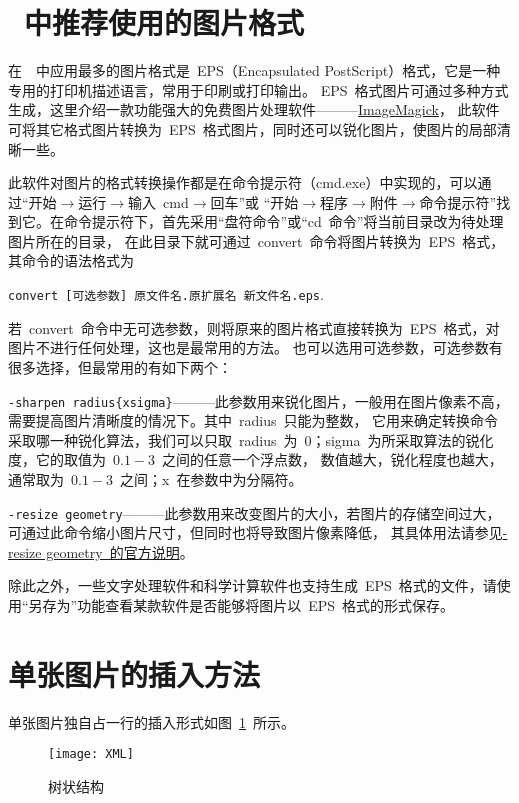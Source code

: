 \section{\XeLaTeX~中推荐使用的图片格式}
在~\XeLaTeX~中应用最多的图片格式是~EPS（Encapsulated PostScript）格式，它是一种专用的打印机描述语言，常用于印刷或打印输出。
EPS~格式图片可通过多种方式生成，这里介绍一款功能强大的免费图片处理软件———\href{http://www.imagemagick.org/}{ImageMagick}，
此软件可将其它格式图片转换为~EPS~格式图片，同时还可以锐化图片，使图片的局部清晰一些。

此软件对图片的格式转换操作都是在命令提示符（cmd.exe）中实现的，可以通过“开始$\to$运行$\to$输入~cmd$\to$回车”或
“开始$\to$程序$\to$附件$\to$命令提示符”找到它。在命令提示符下，首先采用“盘符命令”或“cd~命令”将当前目录改为待处理图片所在的目录，
在此目录下就可通过~convert~命令将图片转换为~EPS~格式，其命令的语法格式为

\indent\verb|convert [可选参数] 原文件名.原扩展名 新文件名.eps|.

若~convert~命令中无可选参数，则将原来的图片格式直接转换为~EPS~格式，对图片不进行任何处理，这也是最常用的方法。
也可以选用可选参数，可选参数有很多选择，但最常用的有如下两个：

\verb|-sharpen radius{xsigma}|———此参数用来锐化图片，一般用在图片像素不高，需要提高图片清晰度的情况下。其中~radius~只能为整数，
它用来确定转换命令采取哪一种锐化算法，我们可以只取~radius~为~0；sigma~为所采取算法的锐化度，它的取值为~$0.1 - 3$~之间的任意一个浮点数，
数值越大，锐化程度也越大，通常取为~$0.1 - 3$~之间；x~在参数中为分隔符。

\verb|-resize geometry|———此参数用来改变图片的大小，若图片的存储空间过大，可通过此命令缩小图片尺寸，但同时也将导致图片像素降低，
其具体用法请参见\href{http://www.imagemagick.org/script/command-line-options.php#resize}{-resize geometry~的官方说明}。

除此之外，一些文字处理软件和科学计算软件也支持生成~EPS~格式的文件，请使用“另存为”功能查看某款软件是否能够将图片以~EPS~格式的形式保存。

\section{单张图片的插入方法}
单张图片独自占一行的插入形式如图~\ref{fig:xml}~所示。
\begin{figure}[H]
\centering
\texttt{[image: XML]}
\caption{树状结构}\label{fig:xml}
\vspace{\baselineskip}
\end{figure}


